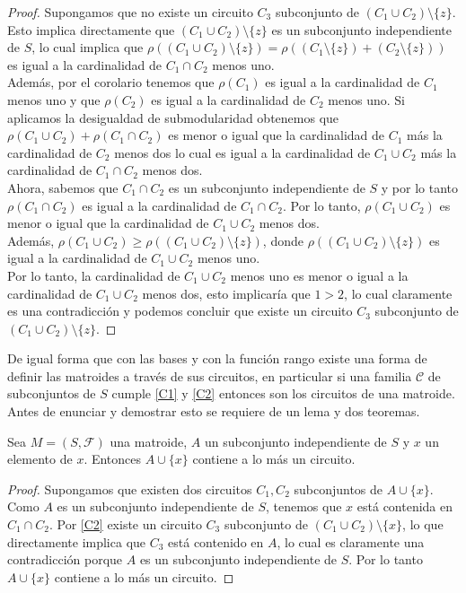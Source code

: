 \begin{proof}
Supongamos que no existe un circuito $C_3$ subconjunto de $(C_1 \cup C_2)\setminus \{z\}$. Esto implica directamente que $(C_1 \cup C_2)\setminus \{z\}$ es un subconjunto independiente de $S$, lo cual implica que $\rho((C_1 \cup C_2)\setminus \{z\}) = \rho((C_1 \setminus \{z\}) + (C_2 \setminus \{z\}) )$ es igual a la cardinalidad de $C_1 \cap C_2$ menos uno. \\ Además, por el corolario \label{circ1} tenemos que $\rho(C_1)$ es igual a la cardinalidad de $C_1$ menos uno y que $\rho(C_2)$ es igual a la cardinalidad de $C_2$ menos uno. Si aplicamos la desigualdad de submodularidad obtenemos que $\rho(C_1 \cup C_2)+ \rho(C_1 \cap C_2 )$ es menor o igual que la cardinalidad de $C_1$ más la cardinalidad de $C_2$ menos dos lo cual es igual a la cardinalidad de $C_1 \cup C_2$ más la cardinalidad de $C_1 \cap C_2$ menos dos. \\
Ahora, sabemos que $C_1 \cap C_2$ es un subconjunto independiente de $S$ y por lo tanto $\rho(C_1 \cap C_2)$ es igual a la cardinalidad de $C_1 \cap C_2$. Por lo tanto, $\rho(C_1 \cup C_2)$ es menor o igual que la cardinalidad de $C_1 \cup C_2$ menos dos. \\
Además, $\rho(C_1 \cup C_2) \geq \rho((C_1 \cup C_2)\setminus \{z\})$, donde $\rho((C_1 \cup C_2)\setminus \{z\})$ es igual a la cardinalidad de $C_1 \cup C_2$ menos uno. \\
Por lo tanto, la cardinalidad de $C_1 \cup C_2$ menos uno es menor o igual a la cardinalidad de $C_1 \cup C_2$ menos dos, esto implicaría que $1>2$, lo cual claramente es una contradicción y podemos concluir que existe un circuito $C_3$ subconjunto de $(C_1 \cup C_2)\setminus \{z\}$.
\end{proof}

De igual forma que con las bases y con la función rango existe una forma de definir las matroides a través de sus circuitos, en particular si una familia $\mathcal{C}$ de subconjuntos de $S$ cumple \ref{C1} y \ref{C2} entonces son los circuitos de una matroide. Antes de enunciar y demostrar esto se requiere de un lema y dos teoremas. 

\begin{lem} \label{lem circuitos}
Sea $M=(S,\mathcal{F})$ una matroide, $A$ un subconjunto independiente de $S$ y $x$ un elemento de $x$. Entonces $A \cup \{x\}$ contiene a lo más un circuito.
\end{lem}

\begin{proof}
Supongamos que existen dos circuitos $C_1,C_2$ subconjuntos de $A \cup \{x\}$. Como $A$ es un subconjunto independiente de $S$, tenemos que $x$ está contenida en $C_1 \cap C_2$. Por \ref{C2} existe un circuito $C_3$ subconjunto de $(C_1 \cup C_2)\setminus \{x\}$, lo que directamente implica que $C_3$ está contenido en $A$, lo cual es claramente una contradicción porque $A$ es un subconjunto independiente de $S$. Por lo tanto $A \cup \{x\}$ contiene a lo más un circuito.
\end{proof}

